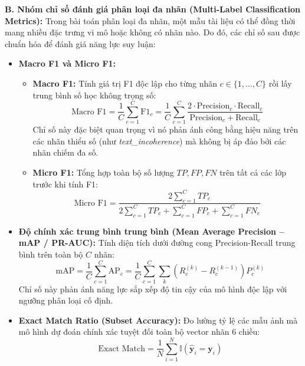 \textbf{B. Nhóm chỉ số đánh giá phân loại đa nhãn (Multi-Label Classification Metrics):}
Trong bài toán phân loại đa nhãn, một mẫu tài liệu có thể đồng thời mang nhiều đặc trưng vi mô hoặc không có nhãn nào. Do đó, các chỉ số sau được chuẩn hóa để đánh giá năng lực suy luận:
\begin{itemize}[label={--}, itemsep=2pt]
    \item \textbf{Macro F1 và Micro F1:}
    \begin{itemize}[label={+}, itemsep=1pt]
        \item \textbf{Macro F1:} Tính giá trị F1 độc lập cho từng nhãn $c \in \{1, \dots, C\}$ rồi lấy trung bình số học không trọng số:
        \begin{equation}
        \text{Macro F1} = \frac{1}{C} \sum_{c=1}^{C} \text{F1}_c = \frac{1}{C} \sum_{c=1}^{C} \frac{2 \cdot \text{Precision}_c \cdot \text{Recall}_c}{\text{Precision}_c + \text{Recall}_c}
        \end{equation}
        Chỉ số này đặc biệt quan trọng vì nó phản ánh công bằng hiệu năng trên các nhãn thiểu số (như \textit{text\_incoherence}) mà không bị áp đảo bởi các nhãn chiếm đa số.
        \item \textbf{Micro F1:} Tổng hợp toàn bộ số lượng $TP, FP, FN$ trên tất cả các lớp trước khi tính F1:
        \begin{equation}
        \text{Micro F1} = \frac{2 \sum_{c=1}^C TP_c}{2 \sum_{c=1}^C TP_c + \sum_{c=1}^C FP_c + \sum_{c=1}^C FN_c}
        \end{equation}
    \end{itemize}
    \item \textbf{Độ chính xác trung bình trung bình (Mean Average Precision -- mAP / PR-AUC):} Tính diện tích dưới đường cong Precision-Recall trung bình trên toàn bộ $C$ nhãn:
    \begin{equation}
    \text{mAP} = \frac{1}{C} \sum_{c=1}^{C} \text{AP}_c = \frac{1}{C} \sum_{c=1}^{C} \sum_{k} (R_c^{(k)} - R_c^{(k-1)}) P_c^{(k)}
    \end{equation}
    Chỉ số này phản ánh năng lực sắp xếp độ tin cậy của mô hình độc lập với ngưỡng phân loại cố định.
    \item \textbf{Exact Match Ratio (Subset Accuracy):} Đo lường tỷ lệ các mẫu ảnh mà mô hình dự đoán chính xác tuyệt đối toàn bộ vector nhãn 6 chiều:
    \begin{equation}
    \text{Exact Match} = \frac{1}{N} \sum_{i=1}^{N} \mathbb{I}(\hat{\mathbf{y}}_i = \mathbf{y}_i)
    \end{equation}

\end{itemize}
